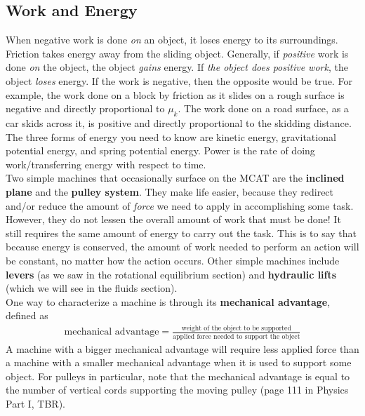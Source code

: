 \documentclass{article}
\theoremstyle{plain}%
\theoremstyle{definition}
\theoremstyle{remark}
\begin{document}
\subsection{Work and Energy}
When negative work is done \textit{on} an object, it loses energy to its surroundings. Friction takes energy away from the sliding object. Generally, if \textit{positive} work is done \textit{on} the object, the object \textit{gains} energy. If \textit{the object does positive work}, the object \textit{loses} energy. If the work is negative, then the opposite would be true. For example, the work done on a block by friction as it slides on a rough surface is negative and directly proportional to $\mu_k$. The work done on a road surface, as a car skids across it, is positive and directly proportional to the skidding distance. \\
\indent The three forms of energy you need to know are kinetic energy, gravitational potential energy, and spring potential energy. Power is the rate of doing work/transferring energy with respect to time.\\
\indent Two simple machines that occasionally surface on the MCAT are the \textbf{inclined plane} and the \textbf{pulley system}. They make life easier, because they redirect and/or reduce the amount of \textit{force} we need to apply in accomplishing some task. However, they do not lessen the overall amount of work that must be done! It still requires the same amount of energy to carry out the task. This is to say that because energy is conserved, the amount of work needed to perform an action will be constant, no matter how the action occurs. Other simple machines include \textbf{levers} (as we saw in the rotational equilibrium section) and \textbf{hydraulic lifts} (which we will see in the fluids section).\\
\indent One way to characterize a machine is through its \textbf{mechanical advantage}, defined as
\begin{equation}
\begin{split}
\text{mechanical advantage}=\frac{\text{weight of the object to be supported}}{\text{applied force needed to support the object}}
\end{split}
\end{equation}
\noindent A machine with a bigger mechanical advantage will require less applied force than a machine with a smaller mechanical advantage when it is used to support some object. For pulleys in particular, note that the mechanical advantage is equal to the number of vertical cords supporting the moving pulley (page 111 in Physics Part I, TBR). \\
\end{document}
